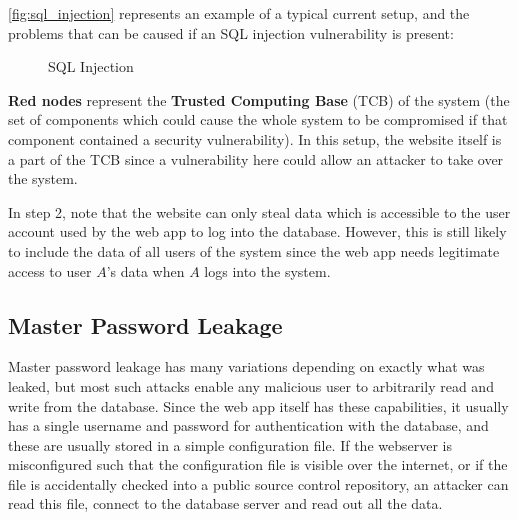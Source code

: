 \documentclass[12pt]{report}
\begin{document}
\autoref{fig:sql_injection} represents an example of a typical current setup, and the problems that can be caused if an SQL injection vulnerability is present:

\begin{figure}[h]
  \begin{center}
  \end{center}
  \caption{SQL Injection}
  \label{fig:sql_injection}
\end{figure}

\textbf{Red nodes} represent the \textbf{Trusted Computing Base} (TCB) of the system (the set of components which could cause the whole system to be compromised if that component contained a security vulnerability). In this setup, the website itself is a part of the TCB since a vulnerability here could allow an attacker to take over the system.

In step 2, note that the website can only steal data which is accessible to the user account used by the web app to log into the database. However, this is still likely to include the data of all users of the system since the web app needs legitimate access to user $A$'s data when $A$ logs into the system.

\subsection{Master Password Leakage}
Master password leakage has many variations depending on exactly what was leaked, but most such attacks enable any malicious user to arbitrarily read and write from the database. Since the web app itself has these capabilities, it usually has a single username and password for authentication with the database, and these are usually stored in a simple configuration file. If the webserver is misconfigured such that the configuration file is visible over the internet, or if the file is accidentally checked into a public source control repository, an attacker can read this file, connect to the database server and read out all the data.
\end{document}
